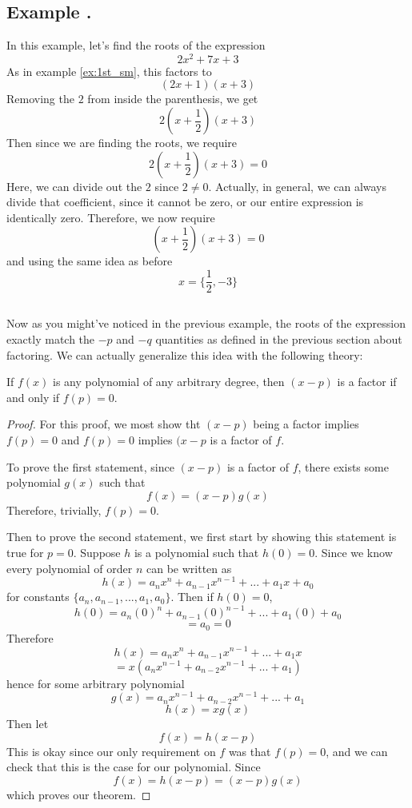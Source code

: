 \documentclass[11pt]{article}
\numberwithin{lemma}{section}
\numberwithin{equation}{section}
\numberwithin{define}{section}
\numberwithin{prop}{section}
\numberwithin{figure}{section}
\numberwithin{theorem}{section}
\newcounter{ex}[section]
\newenvironment{ex}[0]{

	\refstepcounter{ex}
    \subsection*{Example \theex .}
    }
    {
    \subsection*{}
    }
\numberwithin{ex}{section}
\begin{document}
\begin{ex}
	In this example, let's find the roots of the expression 
	$$2x^2+7x+3$$
	As in example \eqref{ex:1st_sm}, this factors to
	$$(2x+1)(x+3)$$
	Removing the $2$ from inside the parenthesis, we get
	$$2(x+\frac{1}{2})(x+3)$$
	Then since we are finding the roots, we require
	$$2(x+\frac{1}{2})(x+3)=0$$
	Here, we can divide out the $2$ since $2\neq0$. Actually, in general, we can always divide that coefficient, 
	since it cannot be zero, or our entire expression is identically zero.
	Therefore, we now require
	$$(x+\frac{1}{2})(x+3)=0$$
	and using the same idea as before
	$$x=\{\frac{1}{2},-3\}$$
\end{ex}

Now as you might've noticed in the previous example, the roots of the expression exactly match the $-p$ and $-q$ quantities as defined in the previous section about factoring. We can actually generalize this idea with the following theory:

\begin{theorem}
	If $f(x)$ is any polynomial of any arbitrary degree, then $(x-p)$ is a factor if and only if \footnotemark $f(p)=0$.
	\label{thm:zero}
\end{theorem}
\begin{proof}
	For this proof, we most show tht $(x-p)$ being a factor implies $f(p)=0$ and $f(p)=0$ implies
	$(x-p$ is a factor of $f$.
	
	To prove the first statement, since $(x-p)$ is a factor of $f$, there exists some polynomial $g(x)$ such that
	$$f(x)=(x-p)g(x)$$
	Therefore, trivially, $f(p)=0$.
	
	Then to prove the second statement, we first start by showing this statement is true for $p=0$.
	Suppose $h$ is a polynomial such that $h(0)=0$.
	Since we know every polynomial of order $n$ can be written as
	$$h(x)=a_nx^n+a_{n-1}x^{n-1}+...+a_1x+a_0$$
	for constants $\{a_n,a_{n-1},...,a_1,a_0\}$.
	Then if $h(0)=0$,
	$$h(0)=a_n(0)^n+a_{n-1}(0)^{n-1}+...+a_1(0)+a_0$$
	$$=a_0=0$$
	Therefore
	$$h(x)=a_nx^n+a_{n-1}x^{n-1}+...+a_1x$$
	$$=x(a_nx^{n-1}+a_{n-2}x^{n-1}+...+a_1)$$
	hence for some arbitrary polynomial
	$$g(x)=a_nx^{n-1}+a_{n-2}x^{n-1}+...+a_1$$
	$$h(x)=xg(x)$$
	Then let
	$$f(x)=h(x-p)$$
	This is okay since our only requirement on $f$ was that $f(p)=0$, and we can check that this is the case for our polynomial.
	Since
	$$f(x)=h(x-p)=(x-p)g(x)$$
	which proves our theorem.
\end{proof}
\end{document}
